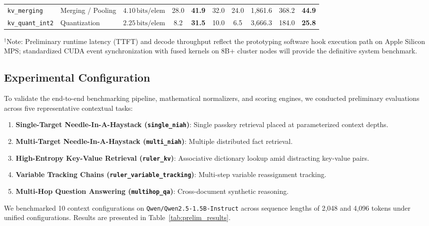 \documentclass[11pt,a4paper]{article}
\begin{document}
\begin{table}[t]
{\begin{tabular}{llcccccccc}
\texttt{kv\_merging} & Merging / Pooling & $4.10\,\text{bits/elem}$ & 28.0 & \textbf{41.9} & 32.0 & 24.0 & 1,861.6 & 368.2 & \textbf{44.9} \\
\texttt{kv\_quant\_int2} & Quantization & $2.25\,\text{bits/elem}$ & 8.2 & \textbf{31.5} & 10.0 & 6.5 & 3,666.3 & 184.0 & \textbf{25.8} \\
\bottomrule
\end{tabular}%
}
\vspace{0.2em}
\raggedright\footnotesize{$^\dagger$Note: Preliminary runtime latency (TTFT) and decode throughput reflect the prototyping software hook execution path on Apple Silicon MPS; standardized CUDA event synchronization with fused kernels on 8B+ cluster nodes will provide the definitive system benchmark.}
\end{table}

\subsection{Experimental Configuration}
To validate the end-to-end benchmarking pipeline, mathematical normalizers, and scoring engines, we conducted preliminary evaluations across five representative contextual tasks:
\begin{enumerate}[leftmargin=*]
    \item \textbf{Single-Target Needle-In-A-Haystack (\texttt{single\_niah})}: Single passkey retrieval placed at parameterized context depths.
    \item \textbf{Multi-Target Needle-In-A-Haystack (\texttt{multi\_niah})}: Multiple distributed fact retrieval.
    \item \textbf{High-Entropy Key-Value Retrieval (\texttt{ruler\_kv})}: Associative dictionary lookup amid distracting key-value pairs.
    \item \textbf{Variable Tracking Chains (\texttt{ruler\_variable\_tracking})}: Multi-step variable reassignment tracking.
    \item \textbf{Multi-Hop Question Answering (\texttt{multihop\_qa})}: Cross-document synthetic reasoning.
\end{enumerate}

We benchmarked 10 context configurations on \texttt{Qwen/Qwen2.5-1.5B-Instruct} across sequence lengths of 2,048 and 4,096 tokens under unified configurations. Results are presented in Table~\ref{tab:prelim_results}.
\end{document}
